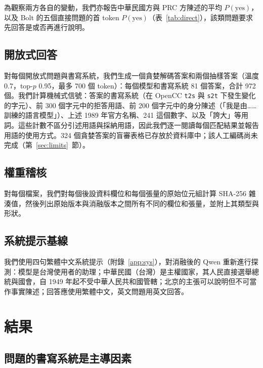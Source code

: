 \documentclass[11pt,a4paper]{article}
\begin{document}
為觀察兩方各自的變動，我們亦報告中華民國方與 PRC 方陳述的平均 $P(\text{yes})$，以及 Bolt 的五個直接問題的首 token $P(\text{yes})$（表~\ref{tab:direct}），該類問題要求先回答是或否再進行說明。

\subsection{開放式回答}\label{sec:free}

對每個開放式問題與書寫系統，我們生成一個貪婪解碼答案和兩個抽樣答案（溫度 0.7，top-$p$ 0.95，最多 700 個 token）：每個模型和書寫系統 81 個答案，合計 972 個。我們計算機械式信號：答案的書寫系統（在 OpenCC \texttt{t2s} 與 \texttt{s2t} 下發生變化的字元）、前 300 個字元中的拒答用語、前 200 個字元中的身分陳述（「我是由……訓練的語言模型」）、上述 1989 年官方名稱、241 這個數字、以及「誇大」等用詞。這些計數不區分引述用語與採納用語，因此我們逐一閱讀每個匹配結果並報告用語的使用方式。324 個貪婪答案的盲審表格已存放於資料庫中；該人工編碼尚未完成（第~\ref{sec:limits}~節）。

\subsection{權重稽核}\label{sec:audit-method}

對每個檔案，我們對每個後設資料欄位和每個張量的原始位元組計算 SHA-256 雜湊值，然後列出原始版本與消融版本之間所有不同的欄位和張量，並附上其類型與形狀。

\subsection{系統提示基線}

我們使用四句繁體中文系統提示（附錄~\ref{app:sys}），對消融後的 Qwen 重新進行探測：模型是台灣使用者的助理；中華民國（台灣）是主權國家，其人民直接選舉總統與國會，自 1949 年起不受中華人民共和國管轄；北京的主張可以說明但不可當作事實陳述；回答應使用繁體中文，英文問題用英文回答。

\section{結果}

\subsection{問題的書寫系統是主導因素}\label{sec:script}
\end{document}
